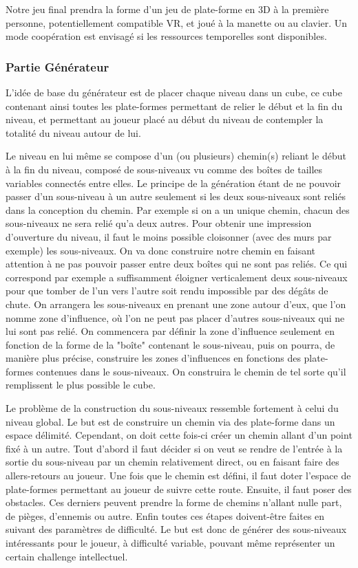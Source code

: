 \documentclass[12pt]{article}
\begin{document}
            Notre jeu final prendra la forme d'un jeu de plate-forme en 3D à la première personne, potentiellement compatible VR, et joué à la manette ou au clavier. Un mode coopération est envisagé si les ressources temporelles sont disponibles.
            
        \subsubsection{Partie Générateur}
            L'idée de base du générateur est de placer chaque niveau dans un cube, ce cube contenant ainsi toutes les plate-formes permettant de relier le début et la fin du niveau, et permettant au joueur placé au début du niveau de contempler la totalité du niveau autour de lui. 

            Le niveau en lui même se compose d'un (ou plusieurs) chemin(s) reliant le début à la fin du niveau, composé de sous-niveaux vu comme des boîtes de tailles variables connectés entre elles. Le principe de la génération étant de ne pouvoir passer d'un sous-niveau à un autre seulement si les deux sous-niveaux sont reliés dans la conception du chemin. Par exemple si on a un unique chemin, chacun des sous-niveaux ne sera relié qu'a deux autres. Pour obtenir une impression d'ouverture du niveau, il faut le moins possible cloisonner (avec des murs par exemple) les sous-niveaux. On va donc construire notre chemin en faisant attention à ne pas pouvoir passer entre deux boîtes qui ne sont pas reliés. Ce qui correspond par exemple a suffisamment éloigner verticalement deux sous-niveaux pour que tomber de l'un vers l'autre soit rendu impossible par des dégâts de chute. On arrangera les sous-niveaux en prenant une zone autour d'eux, que l'on nomme zone d'influence, où l'on ne peut pas placer d'autres sous-niveaux qui ne lui sont pas relié. On commencera par définir la zone d'influence seulement en fonction de la forme de la "boîte" contenant le sous-niveau, puis on pourra, de manière plus précise, construire les zones d'influences en fonctions des plate-formes contenues dans le sous-niveaux. On construira le chemin de tel sorte qu'il remplissent le plus possible le cube.

            Le problème de la construction du sous-niveaux ressemble fortement à celui du niveau global. Le but est de construire un chemin via des plate-forme dans un espace délimité. Cependant, on doit cette fois-ci créer un chemin allant d'un point fixé à un autre.­
            Tout d'abord il faut décider si on veut se rendre de l'entrée à la sortie du sous-niveau par un chemin relativement direct, ou en faisant faire des allers-retours au joueur. Une fois que le chemin est défini, il faut doter l'espace de plate-formes permettant au joueur de suivre cette route. Ensuite, il faut poser des obstacles. Ces derniers peuvent prendre la forme de chemins n'allant nulle part, de pièges, d'ennemis ou autre.
            Enfin toutes ces étapes doivent-être faites en suivant des paramètres de difficulté.
            Le but est donc de générer des sous-niveaux intéressants pour le joueur, à difficulté variable, pouvant même représenter un certain challenge intellectuel.
\end{document}
